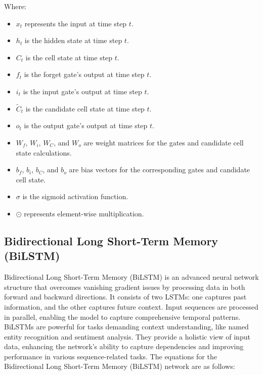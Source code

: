 \documentclass[sn-mathphys,Numbered]{sn-jnl}
\theoremstyle{thmstyleone}
\theoremstyle{thmstyletwo}
\theoremstyle{thmstylethree}
\begin{document}
Where:
\begin{itemize}
\item \(x_t\) represents the input at time step \(t\).
\item \(h_t\) is the hidden state at time step \(t\).
\item \(C_t\) is the cell state at time step \(t\).
\item \(f_t\) is the forget gate's output at time step \(t\).
\item \(i_t\) is the input gate's output at time step \(t\).
\item \(\tilde{C}_t\) is the candidate cell state at time step \(t\).
\item \(o_t\) is the output gate's output at time step \(t\).
\item \(W_f\), \(W_i\), \(W_C\), and \(W_o\) are weight matrices for the gates and candidate cell state calculations.
\item \(b_f\), \(b_i\), \(b_C\), and \(b_o\) are bias vectors for the corresponding gates and candidate cell state.
\item \(\sigma\) is the sigmoid activation function.
\item \(\odot\) represents element-wise multiplication.
\end{itemize}

\subsection{Bidirectional Long Short-Term Memory (BiLSTM)}
Bidirectional Long Short-Term Memory (BiLSTM) is an advanced neural network structure that overcomes vanishing gradient issues by processing data in both forward and backward directions. It consists of two LSTMs: one captures past information, and the other captures future context. Input sequences are processed in parallel, enabling the model to capture comprehensive temporal patterns. BiLSTMs are powerful for tasks demanding context understanding, like named entity recognition and sentiment analysis. They provide a holistic view of input data, enhancing the network's ability to capture dependencies and improving performance in various sequence-related tasks.
The equations for the Bidirectional Long Short-Term Memory (BiLSTM) network are as follows:
\end{document}
